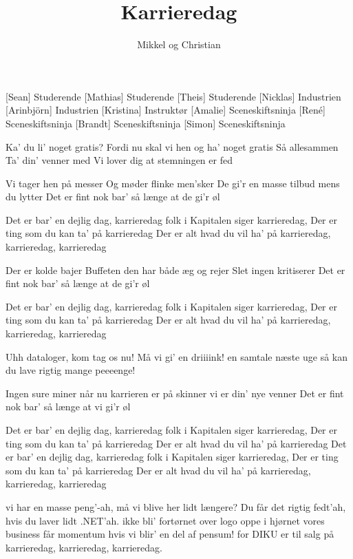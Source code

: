 \documentclass[a4paper,11pt]{article}
\title{Karrieredag}
\author{Mikkel og Christian}
\begin{document}
\maketitle

\begin{roles}
[Sean] Studerende
[Mathias] Studerende
[Theis] Studerende
[Nicklas] Industrien
[Arinbjörn] Industrien
[Kristina] Instruktør
[Amalie] Sceneskiftsninja
[René] Sceneskiftsninja
[Brandt] Sceneskiftsninja
[Simon] Sceneskiftsninja
\end{roles}

\begin{song}
%
Ka’ du li’ noget gratis?
Fordi nu skal vi hen og ha’ noget gratis
Så allesammen
Ta’ din’ venner med
Vi lover dig at stemningen er fed

Vi tager hen på messer
Og møder flinke men’sker
De gi’r en masse tilbud mens du lytter
Det er fint nok bar’ så længe at de gi’r øl

Det er bar’ en dejlig dag, karrieredag
folk i Kapitalen siger karrieredag,
Der er ting som du kan ta’ på karrieredag
Der er alt hvad du vil ha’
på karrieredag, karrieredag, karrieredag

Der er kolde bajer
Buffeten den har både æg og rejer
Slet ingen kritiserer
Det er fint nok bar’ så længe at de gi’r øl

Det er bar’ en dejlig dag, karrieredag
folk i Kapitalen siger karrieredag,
Der er ting som du kan ta’ på karrieredag
Der er alt hvad du vil ha’
på karrieredag, karrieredag, karrieredag

%
Uhh dataloger, kom tag os nu!
Må vi gi’ en driiiink!
en samtale næste uge
så kan du lave rigtig mange peeeenge!

Ingen sure miner
når nu karrieren er på skinner
vi er din’ nye venner
Det er fint nok bar’ så længe at vi gi’r øl

Det er bar’ en dejlig dag, karrieredag
folk i Kapitalen siger karrieredag,
Der er ting som du kan ta’ på karrieredag
Der er alt hvad du vil ha’
på karrieredag
Det er bar’ en dejlig dag, karrieredag
folk i Kapitalen siger karrieredag,
Der er ting som du kan ta’ på karrieredag
Der er alt hvad du vil ha’
på karrieredag, karrieredag, karrieredag

vi har en masse peng’-ah, må vi blive her lidt længere?
Du får det rigtig fedt’ah, hvis du laver lidt .NET’ah.
ikke bli’ fortørnet over logo oppe i hjørnet
vores business får momentum hvis vi blir’ en del af pensum!
for DIKU er til salg på karrieredag, karrieredag, karrieredag.

\end{song}
\end{document}

